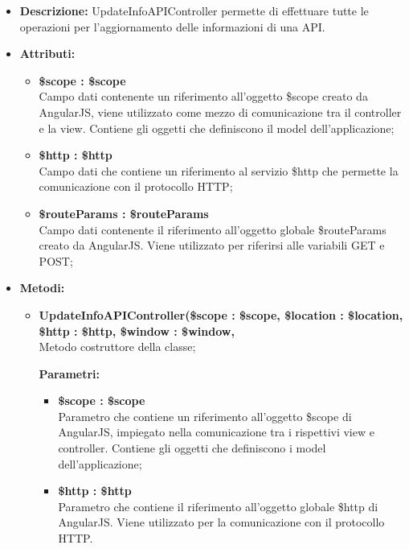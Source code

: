 \begin{itemize}
	\item \textbf{Descrizione:} UpdateInfoAPIController permette di effettuare tutte le operazioni per l'aggiornamento delle informazioni di una API.
	\item \textbf{Attributi:}
	\begin{itemize}
		
		\item \textbf{\$scope : \$scope}\\
		Campo dati contenente un riferimento all'oggetto \$scope creato da AngularJS, viene utilizzato come mezzo di comunicazione tra il controller e la view. Contiene gli oggetti che definiscono il model dell'applicazione;
		
		\item \textbf{\$http : \$http }\\
		Campo dati che contiene un riferimento al servizio \$http che permette la comunicazione con il protocollo HTTP;
		
		\item \textbf{\$routeParams : \$routeParams }\\
		Campo dati contenente il riferimento all'oggetto globale \$routeParams creato da AngularJS. Viene utilizzato per riferirsi alle variabili GET e POST;	
		
	\end{itemize}
	\item \textbf{Metodi:}
	\begin{itemize}
		
		\item \textbf{UpdateInfoAPIController(\$scope : \$scope, \$location : \$location, \$http : \$http, \$window : \$window,}\\
		Metodo costruttore della classe;
		\begin{description}
			\item[\textbf{Parametri:}]
		\end{description}
		\begin{itemize}
			\item \textbf{\$scope : \$scope}\\
			Parametro che contiene un riferimento all'oggetto \$scope di AngularJS, impiegato nella comunicazione tra i rispettivi view e controller. Contiene gli oggetti che definiscono i model dell'applicazione;
			
			\item \textbf{\$http : \$http}\\
			Parametro che contiene il riferimento all'oggetto globale \$http di AngularJS. Viene utilizzato per la comunicazione con il protocollo HTTP.
			

\end{itemize}
\end{itemize}
\end{itemize}
